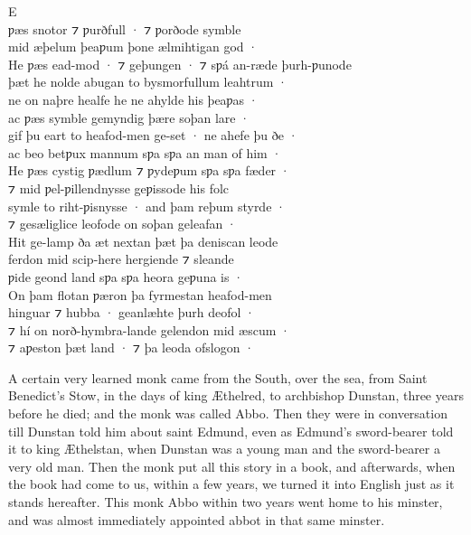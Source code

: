 \documentclass[10pt]{book}
\begin{document}
\begin{center}
\parbox{9.29cm}{
\lettrine[lines=4]{\color{BrickRed}E}{} \\
ƿ\ae{}s snotor ⁊ ƿurðfull · ⁊ ƿorðode symble\\
mid \ae{}þelum þeaƿum þone \ae{}lmihtigan god · \\
He ƿ\ae{}s ead-mod · ⁊ geþungen · ⁊ sƿ\'a an-r\ae{}de þurh-ƿunode \\
þ\ae{}t he nolde abugan to bysmorfullum leahtrum · \\
ne on naþre healfe he ne ahylde his þeaƿas · \\
ac ƿ\ae{}s symble gemyndig þ\ae{}re soþan lare · \\
gif þu eart to heafod-men ge-set · ne ahefe þu ðe · \\
ac beo betƿux mannum sƿa sƿa an man of him · \\
He ƿ\ae{}s cystig ƿ\ae{}dlum ⁊ ƿydeƿum sƿa sƿa f\ae{}der · \\
⁊ mid ƿel-ƿillendnysse geƿissode his folc \\
symle to riht-ƿisnysse · and þam reþum styrde · \\
⁊ ges\ae{}liglice leofode on soþan geleafan · \\
Hit ge-lamp ða \ae{}t nextan þ\ae{}t þa deniscan leode \\
ferdon mid scip-here hergiende ⁊ sleande \\
ƿide geond land sƿa sƿa heora geƿuna is · \\
On þam flotan ƿ\ae{}ron þa fyrmestan heafod-men \\
hinguar ⁊ hubba · geanl\ae{}hte þurh deofol · \\
⁊ hí on norð-hymbra-lande gelendon mid \ae{}scum · \\
⁊ aƿeston þ\ae{}t land · ⁊ þa leoda ofslogon · \\
}
\end{center}

\clearpage

\begin{center}
\footnotesize{}
\end{center}

A certain very learned monk came from the South, over the sea, from  Saint Benedict's Stow, in the days of king \AE{}thelred, to archbishop  Dunstan, three years before he died; and the monk was called Abbo. Then they were in  conversation till Dunstan told him about saint Edmund, even as Edmund's sword-bearer told it to king \AE{}thelstan, when  Dunstan was a young man and the sword-bearer a very old man. Then the monk put  all this story in a book, and afterwards,  when the book had come to us, within a few years, we turned it into  English just as it stands hereafter. This monk Abbo within two years went home to his minster, and  was almost immediately appointed abbot in that same minster.\linebreak{}
\end{document}
